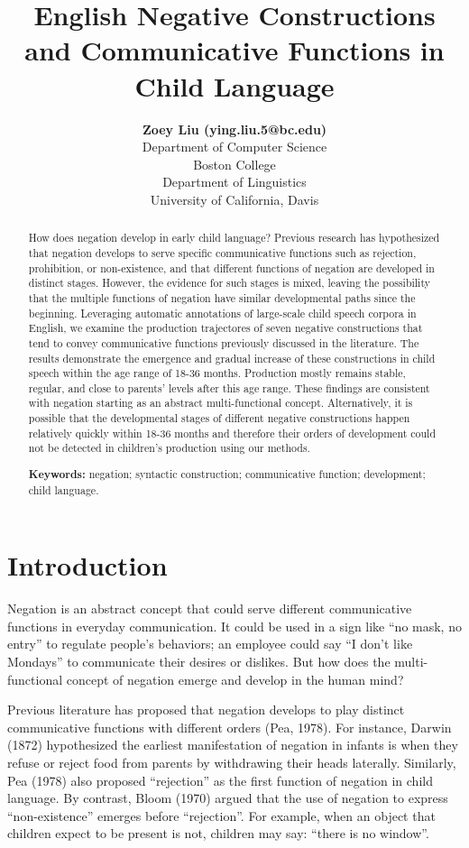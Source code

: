 \documentclass[10pt, letterpaper]{article}
\title{English Negative Constructions and Communicative Functions in Child
Language}
\author{{\large \bf Zoey Liu (ying.liu.5@bc.edu)} \\ Department of Computer Science \\ Boston College \AND {\large \bf Masoud Jasbi (jasbi@ucdavis.edu)} \\ Department of Linguistics \\ University of California, Davis}
\begin{document}
\maketitle

\begin{abstract}
How does negation develop in early child language? Previous research has
hypothesized that negation develops to serve specific communicative
functions such as rejection, prohibition, or non-existence, and that
different functions of negation are developed in distinct stages.
However, the evidence for such stages is mixed, leaving the possibility
that the multiple functions of negation have similar developmental paths
since the beginning. Leveraging automatic annotations of large-scale
child speech corpora in English, we examine the production trajectores
of seven negative constructions that tend to convey communicative
functions previously discussed in the literature. The results
demonstrate the emergence and gradual increase of these constructions in
child speech within the age range of 18-36 months. Production mostly
remains stable, regular, and close to parents' levels after this age
range. These findings are consistent with negation starting as an
abstract multi-functional concept. Alternatively, it is possible that
the developmental stages of different negative constructions happen
relatively quickly within 18-36 months and therefore their orders of
development could not be detected in children's production using our
methods.

\textbf{Keywords:}
negation; syntactic construction; communicative function; development;
child language.
\end{abstract}

\hypertarget{introduction}{%
\section{Introduction}\label{introduction}}

Negation is an abstract concept that could serve different communicative
functions in everyday communication. It could be used in a sign like
``no mask, no entry'' to regulate people's behaviors; an employee could
say ``I don't like Mondays'' to communicate their desires or dislikes.
But how does the multi-functional concept of negation emerge and develop
in the human mind?

Previous literature has proposed that negation develops to play distinct
communicative functions with different orders (Pea, 1978). For instance,
Darwin (1872) hypothesized the earliest manifestation of negation in
infants is when they refuse or reject food from parents by withdrawing
their heads laterally. Similarly, Pea (1978) also proposed ``rejection''
as the first function of negation in child language. By contrast, Bloom
(1970) argued that the use of negation to express ``non-existence''
emerges before ``rejection''. For example, when an object that children
expect to be present is not, children may say: ``there is no window''.
\end{document}
